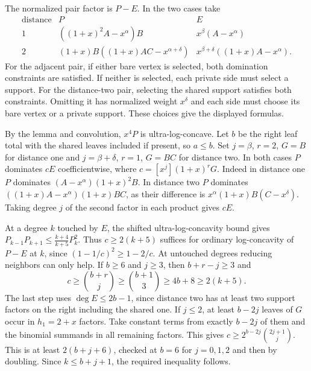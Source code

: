 \documentclass[10pt]{article}
\begin{document}
The normalized pair factor is \(P-E\). In the two cases take
\[
\begin{array}{c|l|l}
\text{distance} & P & E\\ \hline
1 & ((1+x)^2A-x^\alpha)B & x^\beta(A-x^\alpha)\\
2 & (1+x)B((1+x)AC-x^{\alpha+\delta}) &
          x^{\beta+\delta}((1+x)A-x^\alpha).
\end{array}
\]
For the adjacent pair, if either bare vertex is selected, both
domination constraints are satisfied. If neither is selected,
each private side must select a support. For the distance-two
pair, selecting the shared support satisfies both constraints.
Omitting it has normalized weight \(x^\delta\) and each side
must choose its bare vertex or a private support. These choices
give the displayed formulas.

By the lemma and convolution, \(x^4P\) is ultra-log-concave.
Let \(b\) be the right leaf total with the shared leaves included
if present, so \(a\le b\). Set \(j=\beta\), \(r=2\),
\(G=B\) for distance one and \(j=\beta+\delta\), \(r=1\),
\(G=BC\) for distance two. In both cases \(P\) dominates
\(cE\) coefficientwise, where \(c=[x^j](1+x)^rG\).
Indeed in distance one \(P\) dominates \((A-x^\alpha)(1+x)^2B\).
In distance two \(P\) dominates \(((1+x)A-x^\alpha)(1+x)BC\),
as their difference is \(x^\alpha(1+x)B(C-x^\delta)\).
Taking degree \(j\) of the second factor in each product
gives \(cE\).

At a degree \(k\) touched by \(E\), the shifted ultra-log-concavity
bound gives \(P_{k-1}P_{k+1}\le \frac{k+4}{k+5}P_k^2\).
Thus \(c\ge2(k+5)\) suffices for ordinary log-concavity of \(P-E\)
at \(k\), since \((1-1/c)^2\ge1-2/c\).
At untouched degrees reducing neighbors can only help.
If \(b\ge6\) and \(j\ge3\), then \(b+r-j\ge3\) and
\[
c\ge\binom{b+r}{j}\ge\binom{b+1}{3}\ge4b+8\ge2(k+5).
\]
The last step uses \(\deg E\le2b-1\), since distance two has
at least two support factors on the right including the shared one.
If \(j\le2\), at least \(b-2j\) leaves of \(G\) occur in \(h_1=2+x\)
factors. Take constant terms from exactly \(b-2j\) of them and the
binomial summands in all remaining factors. This gives
\(c\ge2^{b-2j}\binom{2j+1}{j}\).
This is at least \(2(b+j+6)\), checked at \(b=6\) for \(j=0,1,2\)
and then by doubling. Since \(k\le b+j+1\), the required inequality
follows.
\end{document}
